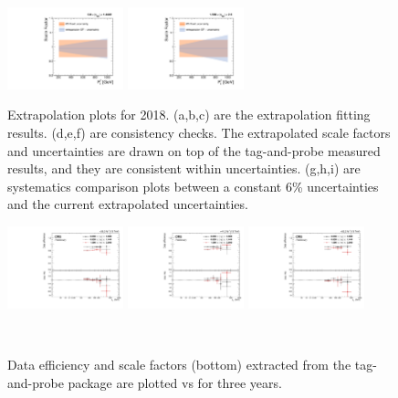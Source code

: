 \begin{figure}[!htbp]
  \includegraphics[width=0.3\textwidth]{fig/Extrapolate_2018_1_Compare.pdf}
  \includegraphics[width=0.3\textwidth]{fig/Extrapolate_2018_2_Compare.pdf}
  \caption{Extrapolation plots for 2018. (a,b,c) are the extrapolation fitting results. (d,e,f) are consistency checks. The extrapolated scale factors and uncertainties are drawn on top of the tag-and-probe measured results, and they are consistent within uncertainties. (g,h,i) are systematics comparison plots between a constant 6\% uncertainties and the current extrapolated uncertainties.}
  \label{fig:Extrapolation2018}
\end{figure}

\begin{figure}[tbp!]
\begin{center}
\includegraphics[angle=0,width=0.3\textwidth]{fig/eff2016.pdf}
\includegraphics[angle=0,width=0.3\textwidth]{fig/eff2017.pdf}
\includegraphics[angle=0,width=0.3\textwidth]{fig/eff2018.pdf}
\end{center}
\caption{Data efficiency and scale factors (bottom) extracted from the tag-and-probe package are plotted vs \pt for three years.}
~\label{fig:SFvsPt}
\end{figure}

